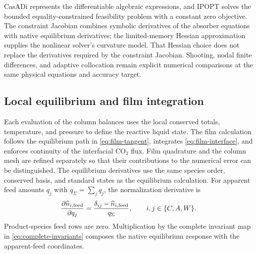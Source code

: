 CasADi represents the differentiable algebraic expressions, and IPOPT solves the bounded equality-constrained feasibility problem with a constant zero objective.
The constraint Jacobian combines symbolic derivatives of the absorber equations with native equilibrium derivatives; the limited-memory Hessian approximation supplies the nonlinear solver's curvature model.
That Hessian choice does not replace the derivatives required by the constraint Jacobian.
Shooting, nodal finite differences, and adaptive collocation remain explicit numerical comparisons at the same physical equations and accuracy target.

\subsection{Local equilibrium and film integration}
Each evaluation of the column balances uses the local conserved totals, temperature, and pressure to define the reactive liquid state.
The film calculation follows the equilibrium path in \cref{eq:film-tangent}, integrates \cref{eq:film-interface}, and enforces continuity of the interfacial CO$_2$ flux.
Film quadrature and the column mesh are refined separately so that their contributions to the numerical error can be distinguished.
The equilibrium derivatives use the same species order, conserved basis, and standard states as the equilibrium calculation.
For apparent feed amounts $q_j$ with $q_\Sigma=\sum_j q_j$, the normalization derivative is
\begin{align}
\pdv{\widehat n_{i,\mathrm{feed}}}{q_j}
=\frac{\delta_{ij}-\widehat n_{i,\mathrm{feed}}}{q_\Sigma},
\qquad i,j\in\{C,A,W\}.
\end{align}
Product-species feed rows are zero.
Multiplication by the complete invariant map in \cref{eq:complete-invariants} composes the native equilibrium response with the apparent-feed coordinates.


